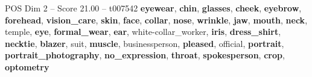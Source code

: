 \begin{textsample}{POS Dim 2 – Score 21.00 – t007542}  \label{ex:f2_pos_022}
\textbf{eyewear}, \textbf{chin}, \textbf{glasses}, \textbf{cheek}, \textbf{eyebrow}, \textbf{forehead}, \textbf{vision\_care}, \textbf{skin}, \textbf{face}, \textbf{collar}, \textbf{nose}, \textbf{wrinkle}, \textbf{jaw}, \textbf{mouth}, \textbf{neck}, temple, \textbf{eye}, \textbf{formal\_wear}, \textbf{ear}, white-collar\_worker, \textbf{iris}, \textbf{dress\_shirt}, \textbf{necktie}, \textbf{blazer}, suit, \textbf{muscle}, businessperson, \textbf{pleased}, official, \textbf{portrait}, \textbf{portrait\_photography}, \textbf{no\_expression}, \textbf{throat}, \textbf{spokesperson}, \textbf{crop}, \textbf{optometry}

\end{textsample}
